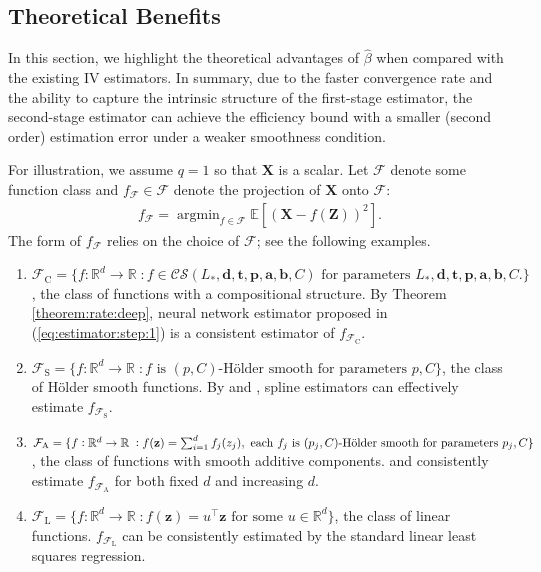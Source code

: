 \documentclass[11pt, preprint]{imsart}
\DeclareMathOperator*{\argmin}{argmin}
\numberwithin{equation}{section}
\def \mcF{\mathcal{F}}
\def \mcCS{\mathcal{C}\mathcal{S}}
\def \bfX{\mathbf{X}}
\def \bfZ{\mathbf{Z}}
\def \bfz{\mathbf{z}}
\def \bfd{\mathbf{d}}
\def \bft{\mathbf{t}}
\def \bfp{\mathbf{p}}
\def \bfa{\mathbf{a}}
\def \bfb{\mathbf{b}}
\def \bfa{\mathbf{a}}
\def \bfb{\mathbf{b}}
\def \ev{\mathbb{E}}
\def \bft{\mathbf{t}}
\theoremstyle{plain}
\theoremstyle{definition}
\begin{document}
\subsection{Theoretical Benefits}\label{sec:boosting:efficiency}

In this section, we highlight the theoretical advantages of $\widehat{\beta}$ when compared with the existing IV estimators. In summary, due to the faster convergence rate and the ability to capture the intrinsic structure of the first-stage estimator, the second-stage estimator can achieve the efficiency bound with a smaller (second order) estimation error under a weaker smoothness condition.

For illustration, we assume $q=1$ so that $\bfX$ is a scalar. Let $\mcF$ denote some function class and $f_\mcF\in\mcF$ denote the projection of $\bfX$ onto $\mcF$:
\begin{eqnarray}\label{eq:population:minimizer}
	f_\mcF=\argmin_{f\in \mcF}\ev[(\bfX-f(\bfZ))^2].\nonumber
\end{eqnarray}
The form of $f_\mcF$ relies on the choice of $\mcF$; see the following examples.
\begin{enumerate}
\item\label{eq:mcFC} $\mcF_{\textrm{C}}=\{f: \mathbb{R}^d\to \mathbb{R}\;: f\in \mcCS(L_*, \bfd, \bft, \bfp,\bfa, \bfb, C) \textrm{ for parameters } L_*, \bfd, \bft, \bfp,\bfa, \bfb, C.\}$, the class of  functions with a compositional structure.
By Theorem \ref{theorem:rate:deep}, neural network estimator proposed in (\ref{eq:estimator:step:1}) is a consistent estimator of $f_{\mcF_\textrm{C}}$. 
\item \label{eq:mcFS}  $\mcF_{\textrm{S}}=\{f: \mathbb{R}^d\to \mathbb{R}\;: f \textrm{ is } (p, C)\textrm{-H\" older smooth for parameters } p, C\}$,  the class of H\"older smooth functions. By \cite{s94} and \cite{h03}, spline estimators can effectively estimate $f_{\mcF_\textrm{S}}$. 
\item \label{eq:mcFA}  $\mcF_{\textrm{A}}=\{f: \mathbb{R}^d\to \mathbb{R}\;: f(\bfz)=\sum_{i=1}^df_j(z_j), \textrm{ each } f_j \textrm{ is } (p_j, C)\textrm{-H\" older smooth for parameters } \newline p_j, C \}$, the class of  functions with smooth additive components.
\cite{h03} and \cite{hhw10} consistently estimate $f_{\mcF_\textrm{A}}$ for both fixed $d$ and increasing $d$.

\item \label{eq:mcFL} $\mcF_{\textrm{L}}=\{f: \mathbb{R}^d\to \mathbb{R}\;: f(\bfz)=u^\top \bfz \textrm{ for some } u\in \mathbb{R}^d\}$, the class of linear functions. $f_{\mcF_\textrm{L}}$ can be consistently estimated by the standard linear least squares regression.
\end{enumerate}
\end{document}

